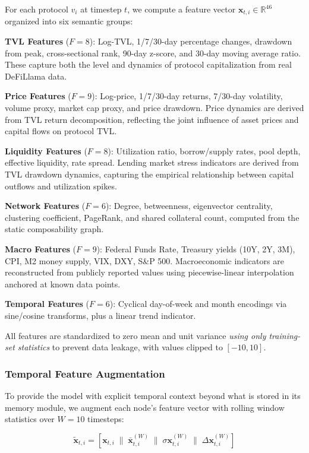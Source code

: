\documentclass[journal]{IEEEtran}
\begin{document}
For each protocol $v_i$ at timestep $t$, we compute a feature vector $\mathbf{x}_{t,i} \in \mathbb{R}^{46}$ organized into six semantic groups:

\textbf{TVL Features} ($F = 8$): Log-TVL, 1/7/30-day percentage changes, drawdown from peak, cross-sectional rank, 90-day z-score, and 30-day moving average ratio. These capture both the level and dynamics of protocol capitalization from real DeFiLlama data.

\textbf{Price Features} ($F = 9$): Log-price, 1/7/30-day returns, 7/30-day volatility, volume proxy, market cap proxy, and price drawdown. Price dynamics are derived from TVL return decomposition, reflecting the joint influence of asset prices and capital flows on protocol TVL.

\textbf{Liquidity Features} ($F = 8$): Utilization ratio, borrow/supply rates, pool depth, effective liquidity, rate spread. Lending market stress indicators are derived from TVL drawdown dynamics, capturing the empirical relationship between capital outflows and utilization spikes.

\textbf{Network Features} ($F = 6$): Degree, betweenness, eigenvector centrality, clustering coefficient, PageRank, and shared collateral count, computed from the static composability graph.

\textbf{Macro Features} ($F = 9$): Federal Funds Rate, Treasury yields (10Y, 2Y, 3M), CPI, M2 money supply, VIX, DXY, S\&P 500. Macroeconomic indicators are reconstructed from publicly reported values using piecewise-linear interpolation anchored at known data points.

\textbf{Temporal Features} ($F = 6$): Cyclical day-of-week and month encodings via sine/cosine transforms, plus a linear trend indicator.

All features are standardized to zero mean and unit variance \emph{using only training-set statistics} to prevent data leakage, with values clipped to $[-10, 10]$.

\subsubsection{Temporal Feature Augmentation}

To provide the model with explicit temporal context beyond what is stored in its memory module, we augment each node's feature vector with rolling window statistics over $W = 10$ timesteps:

\begin{equation}
    \tilde{\mathbf{x}}_{t,i} = \left[\mathbf{x}_{t,i} \;\|\; \bar{\mathbf{x}}_{t,i}^{(W)} \;\|\; \sigma\mathbf{x}_{t,i}^{(W)} \;\|\; \Delta\mathbf{x}_{t,i}^{(W)}\right]
\end{equation}
\end{document}
